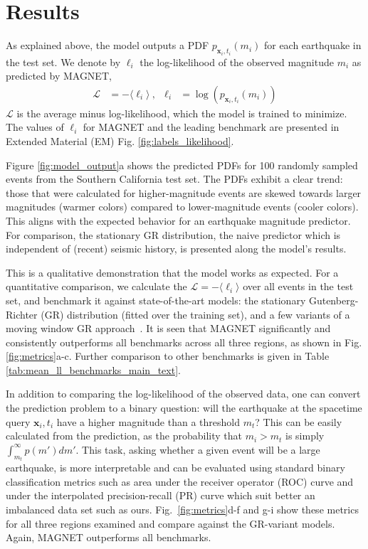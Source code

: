 \documentclass[pdflatex]{sn-jnl}
\begin{document}
\section{Results} \label{sec:results}
As explained above, the model outputs a PDF $p_{\textbf{x}_i, t_i}(m_i)$ for each earthquake in the test set. We denote by $\ell_i$ the log-likelihood of the observed magnitude $m_i$ as predicted by MAGNET, 
\begin{align}
    \mathcal{L} &= -\langle \ell_i \rangle\ , 
    &
    \ell_i&=\log\left(p_{\textbf{x}_i, t_i}(m_i)\right)
    \label{eq:likelihood}
\end{align}
 $\mathcal{L}$ is the average minus log-likelihood, which the model is trained to minimize.  The values of $\ell_i$ for MAGNET and the leading benchmark are presented in Extended Material (EM) Fig. \ref{fig:labels_likelihood}.
 

Figure \ref{fig:model_output}a shows the predicted PDFs for 100 randomly sampled events from the Southern California test set. The PDFs exhibit a clear trend: those that were calculated for higher-magnitude events are skewed towards larger magnitudes (warmer colors) compared to lower-magnitude events (cooler colors). This aligns with the expected behavior for an earthquake magnitude predictor. For comparison, the stationary GR distribution, the naive predictor which is independent of (recent) seismic history, is presented along the model's results.

This is a qualitative demonstration that the model works as expected. For a quantitative comparison, we calculate the $\mathcal{L}=-\langle \ell_i \rangle$ over all events in the test set, and benchmark it against state-of-the-art models:
the stationary Gutenberg-Richter (GR) distribution (fitted over the training set), and a few variants of a moving window GR approach~\cite{gulia_real-time_2019}. It is seen that MAGNET significantly and consistently outperforms all benchmarks across all three regions, as shown in Fig. \ref{fig:metrics}a-c. Further comparison to other benchmarks is given in Table \ref{tab:mean_ll_benchmarks_main_text}.

In addition to comparing the log-likelihood of the observed data, one can convert the prediction problem to a binary question: will the earthquake at the spacetime query $\textbf{x}_i, t_i$ have a higher magnitude than a threshold $m_t$? This can be easily calculated from the prediction, as the probability that $m_i>m_t$ is simply $\int_{m_t}^{\infty}p(m')dm'$.
This task, asking whether a given event will be a large earthquake, is more interpretable and can be evaluated using standard binary classification metrics such as area under the receiver operator (ROC) curve \cite{Murphy} and under the interpolated precision-recall (PR) curve \cite{buttcher_information_2010} which suit better an imbalanced data set such as ours. Fig.~\ref{fig:metrics}d-f and g-i show these metrics for all three regions examined and compare against the GR-variant models. Again, MAGNET outperforms all benchmarks.
\end{document}
